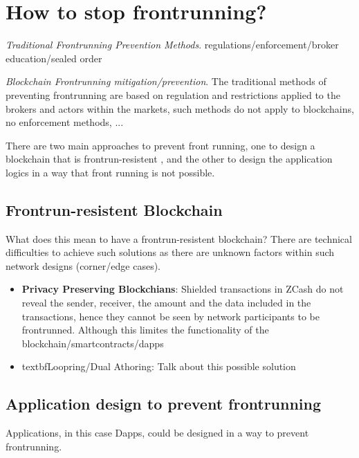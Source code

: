 \section{How to stop frontrunning?}

\emph{Traditional Frontrunning Prevention Methods}. regulations/enforcement/broker education/sealed order


\emph{Blockchain Frontrunning mitigation/prevention}. The traditional methods of preventing frontrunning are based on regulation and restrictions applied to the brokers and actors within the markets, such methods do not apply to blockchains, no enforcement methods, ... 

There are two main approaches to prevent front running, one to design a blockchain that is frontrun-resistent , and the other to design the application logics in a way that front running is not possible. 


\subsection{Frontrun-resistent Blockchain}
What does this mean to have a frontrun-resistent blockchain?  There are technical difficulties to achieve such solutions as there are unknown factors within such network designs (corner/edge cases).

\begin{itemize}
\item{\textbf{Privacy Preserving Blockchians}: Shielded transactions in ZCash do not reveal the sender, receiver, the amount and the data included in the transactions, hence they cannot be seen by network participants to be frontrunned. Although this limites the functionality of the blockchain/smartcontracts/dapps }
\item{textbf{Loopring/Dual Athoring}: Talk about this possible solution}

\end{itemize}


\subsection{Application design to prevent frontrunning}
Applications, in this case Dapps, could be designed in a way to prevent frontrunning.

